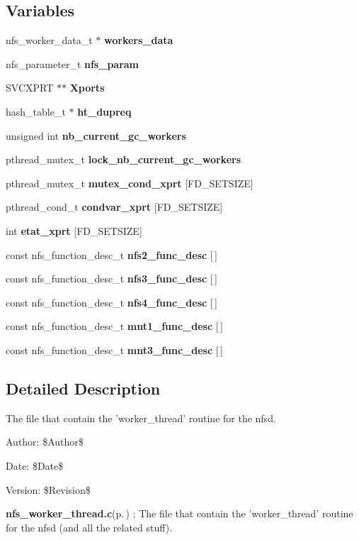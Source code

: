 \subsection*{Variables}
\begin{CompactItemize}
\item 
nfs\_\-worker\_\-data\_\-t $\ast$ {\bf workers\_\-data}
\item 
nfs\_\-parameter\_\-t {\bf nfs\_\-param}
\item 
SVCXPRT $\ast$$\ast$ {\bf Xports}
\item 
hash\_\-table\_\-t $\ast$ {\bf ht\_\-dupreq}
\item 
unsigned int {\bf nb\_\-current\_\-gc\_\-workers}
\item 
pthread\_\-mutex\_\-t {\bf lock\_\-nb\_\-current\_\-gc\_\-workers}
\item 
pthread\_\-mutex\_\-t {\bf mutex\_\-cond\_\-xprt} [FD\_\-SETSIZE]
\item 
pthread\_\-cond\_\-t {\bf condvar\_\-xprt} [FD\_\-SETSIZE]
\item 
int {\bf etat\_\-xprt} [FD\_\-SETSIZE]
\item 
const nfs\_\-function\_\-desc\_\-t {\bf nfs2\_\-func\_\-desc} [$\,$]
\item 
const nfs\_\-function\_\-desc\_\-t {\bf nfs3\_\-func\_\-desc} [$\,$]
\item 
const nfs\_\-function\_\-desc\_\-t {\bf nfs4\_\-func\_\-desc} [$\,$]
\item 
const nfs\_\-function\_\-desc\_\-t {\bf mnt1\_\-func\_\-desc} [$\,$]
\item 
const nfs\_\-function\_\-desc\_\-t {\bf mnt3\_\-func\_\-desc} [$\,$]
\end{CompactItemize}


\subsection{Detailed Description}
The file that contain the 'worker\_\-thread' routine for the nfsd. 

\begin{Desc}
\item[Author:]\$Author\$ \end{Desc}
\begin{Desc}
\item[Date:]\$Date\$ \end{Desc}
\begin{Desc}
\item[Version:]\$Revision\$ \end{Desc}
{\bf nfs\_\-worker\_\-thread.c}{\rm (p.\,\pageref{nfs__worker__thread_8c})} : The file that contain the 'worker\_\-thread' routine for the nfsd (and all the related stuff).

